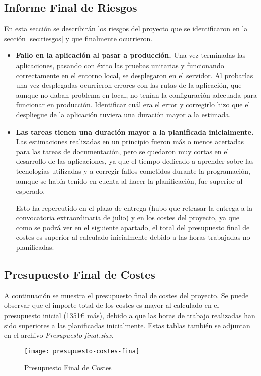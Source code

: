 \subsection{Informe Final de Riesgos}
En esta sección se describirán los riesgos del proyecto que se identificaron en la sección \ref{sec:riesgos} y que finalmente ocurrieron.
\begin{itemize}
\item \textbf{Fallo en la aplicación al pasar a producción.} Una vez terminadas las aplicaciones, pasando con éxito las pruebas unitarias y funcionando correctamente en el entorno local, se desplegaron en el servidor. Al probarlas una vez desplegadas ocurrieron errores con las rutas de la aplicación, que aunque no daban problema en local, no tenían la configuración adecuada para funcionar en producción. Identificar cuál era el error y corregirlo hizo que el despliegue de la aplicación tuviera una duración mayor a la estimada.
\item \textbf{Las tareas tienen una duración mayor a la planificada inicialmente.} Las estimaciones realizadas en un principio fueron más o menos acertadas para las tareas de documentación, pero se quedaron muy cortas en el desarrollo de las aplicaciones, ya que el tiempo dedicado a aprender sobre las tecnologías utilizadas y a corregir fallos cometidos durante la programación, aunque se había tenido en cuenta al hacer la planificación, fue superior al esperado.\par  Esto ha repercutido en el plazo de entrega (hubo que retrasar la entrega a la convocatoria extraordinaria de julio) y en los costes del proyecto, ya que como se podrá ver en el siguiente apartado, el total del presupuesto final de costes es superior al calculado inicialmente debido a las horas trabajadas no planificadas.
\end{itemize}
\subsection{Presupuesto Final de Costes}
A continuación se muestra el presupuesto final de costes del proyecto. Se puede observar que el importe total de los costes es mayor al calculado en el presupuesto inicial (1351€ más), debido a que las horas de trabajo realizadas han sido superiores a las planificadas inicialmente. Estas tablas también se adjuntan en el archivo \textit{Presupuesto final.xlsx}.
\begin{figure}[H]
\centering
\centerline{\texttt{[image: presupuesto-costes-fina]}}
\caption{Presupuesto Final de Costes}
\end{figure} 

